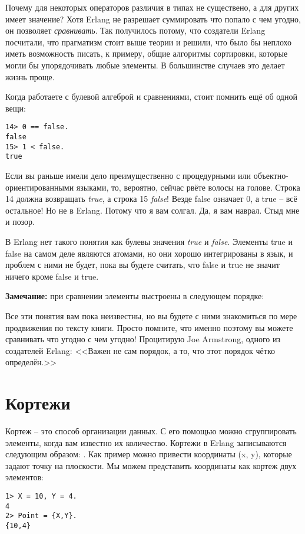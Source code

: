 Почему для некоторых операторов различия в типах не существено, а для других имеет значение?
Хотя Erlang не разрешает суммировать что попало с чем угодно, он позволяет \emph{сравнивать}.
Так получилось потому, что создатели Erlang посчитали, что прагматизм стоит выше теории и решили, что было бы неплохо иметь возможность писать, к примеру, общие алгоритмы сортировки, которые могли бы упорядочивать любые элементы.
В большинстве случаев это делает жизнь проще.

Когда работаете с булевой алгеброй и сравнениями, стоит помнить ещё об одной вещи:
\begin{lstlisting}[style=repl]
14> 0 == false.
false
15> 1 < false.
true
\end{lstlisting}

Если вы раньше имели дело преимущественно с процедурными или объектно\--ориентированными языками, то, вероятно, сейчас рвёте волосы на голове.
Строка 14 должна возвращать \emph{true}, а строка 15 \emph{false}!
Везде false означает 0, а true \--- всё остальное!
Но не в Erlang.
Потому что я вам солгал.
Да, я вам наврал.
Стыд мне и позор.

В Erlang нет такого понятия как булевы значения \emph{true} и \emph{false}.
Элементы true и false на самом деле являются атомами, но они хорошо интегрированы в язык, и проблем с ними не будет, пока вы будете считать, что false и true не значит ничего кроме false и true.\\ 
\colorbox{lgray}
{
    \begin{minipage}{1.0\linewidth}
    \textbf{Замечание:} при сравнении элементы выстроены в следующем порядке:\\ 
    
    Все эти понятия вам пока неизвестны, но вы будете с ними знакомиться по мере продвижения по тексту книги.
    Просто помните, что именно поэтому вы можете сравнивать что угодно с чем угодно!
    Процитирую Joe Armstrong, одного из создателей Erlang: <<Важен не сам порядок, а то, что этот порядок чётко определён.>>
    \end{minipage}
}
\section{Кортежи}
Кортеж \--- это способ организации данных.
С его помощью можно сгруппировать элементы, когда вам известно их количество.
Кортежи в Erlang записываются следующим образом: .
Как пример можно привести координаты (x, y), которые задают точку на плоскости.
Мы можем представить координаты как кортеж двух элементов:
\begin{lstlisting}[style=repl]
1> X = 10, Y = 4.
4
2> Point = {X,Y}.
{10,4}
\end{lstlisting}

